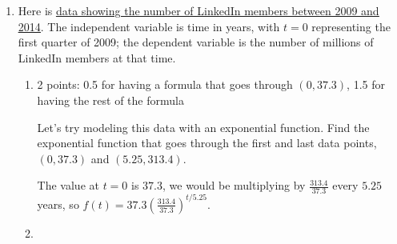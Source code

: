 \documentclass{article}
\makeatletter
\let\@href=\href
\renewcommand{\href}[2]{\@href{#1}{\ul{#2}}}
\makeatother
\begin{document}
\begin{enumerate}
\begin{enumerate}
\begin{problem}[\newpage]
      No explanation is necessary. 
    \end{problem}

    \begin{solution}
      The function we found in part (c) matches only choice (ii),
      . We can show that this must be the
      case.
      \begin{align*}
          \log_{10} y &= m\log_{10}x + c \\
          10^{\log_{10}y} &= 10^{m\log_{10} x + c} \\
          y &= 10^c x^m
      \end{align*}
    \end{solution}

  \end{enumerate}

\item 


  Here is \href{https://www.desmos.com/calculator/crrpolwdxo}{data showing the number of LinkedIn members between 2009 and 2014}. The independent variable is time in years, with $t = 0$ representing the first quarter of 2009; the dependent variable is the number of millions of LinkedIn members at that time.

  \begin{enumerate}
  \item

    \begin{grading}
      2 points: 0.5 for having a formula that goes through $(0, 37.3)$, 1.5 for having the rest of the formula
    \end{grading}

    \begin{problem}[\vfill]
      Let's try modeling this data with an exponential function. Find the exponential function that goes through the first and last data points, $(0, 37.3)$ and $(5.25, 313.4)$.
    \end{problem}

    \begin{solution}
      The value at $t=0$ is $37.3$, we would be multiplying by
      $\tfrac{313.4}{37.3}$ every $5.25$ years, so
      $f(t)=\boxed{37.3(\tfrac{313.4}{37.3})^{t/5.25}}$.
    \end{solution}

  \item


\end{enumerate}
\end{enumerate}
\end{document}
